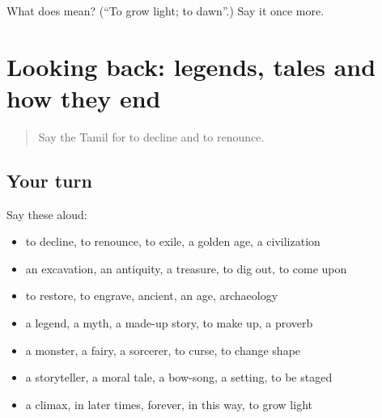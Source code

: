 \begin{tcolorbox}[breakable,colback=teal!4,colframe=teal!35!black,title={Before you move on}]
What does  mean? (\textquotedblleft{}To grow light; to dawn\textquotedblright{}.) Say it once more.
\end{tcolorbox}
\section[(dialogue)]{Looking back: legends, tales and how they end}

\label{lesson:TA-R346-review-340-346}



\begin{quote}
Say the Tamil for to decline and to renounce.
\end{quote}

\subsection*{Your turn}
Say these aloud:

\begin{itemize}
\raggedright
  \item to decline, to renounce, to exile, a golden age, a civilization
  \item an excavation, an antiquity, a treasure, to dig out, to come upon
  \item to restore, to engrave, ancient, an age, archaeology
  \item a legend, a myth, a made-up story, to make up, a proverb
  \item a monster, a fairy, a sorcerer, to curse, to change shape
  \item a storyteller, a moral tale, a bow-song, a setting, to be staged
  \item a climax, in later times, forever, in this way, to grow light
\end{itemize}

